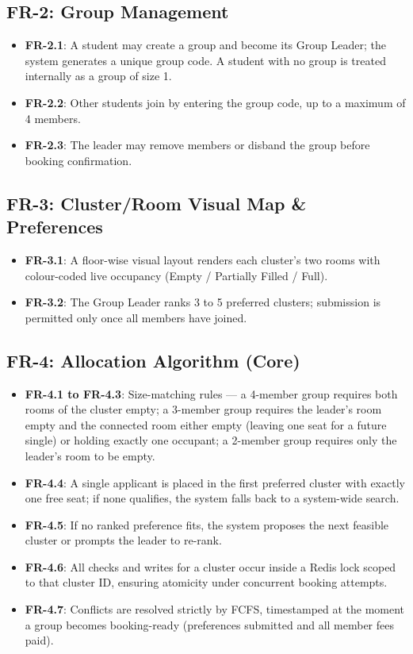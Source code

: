 \documentclass[11pt]{report}
\begin{document}
\subsection*{FR-2: Group Management}
\begin{itemize}[leftmargin=1.2cm]
    \item \textbf{FR-2.1}: A student may create a group and become its Group Leader; the system generates a unique group code. A student with no group is treated internally as a group of size 1.
    \item \textbf{FR-2.2}: Other students join by entering the group code, up to a maximum of 4 members.
    \item \textbf{FR-2.3}: The leader may remove members or disband the group before booking confirmation.
\end{itemize}

\subsection*{FR-3: Cluster/Room Visual Map \& Preferences}
\begin{itemize}[leftmargin=1.2cm]
    \item \textbf{FR-3.1}: A floor-wise visual layout renders each cluster's two rooms with colour-coded live occupancy (Empty / Partially Filled / Full).
    \item \textbf{FR-3.2}: The Group Leader ranks 3 to 5 preferred clusters; submission is permitted only once all members have joined.
\end{itemize}

\subsection*{FR-4: Allocation Algorithm (Core)}
\begin{itemize}[leftmargin=1.2cm]
    \item \textbf{FR-4.1 to FR-4.3}: Size-matching rules --- a 4-member group requires both rooms of the cluster empty; a 3-member group requires the leader's room empty and the connected room either empty (leaving one seat for a future single) or holding exactly one occupant; a 2-member group requires only the leader's room to be empty.
    \item \textbf{FR-4.4}: A single applicant is placed in the first preferred cluster with exactly one free seat; if none qualifies, the system falls back to a system-wide search.
    \item \textbf{FR-4.5}: If no ranked preference fits, the system proposes the next feasible cluster or prompts the leader to re-rank.
    \item \textbf{FR-4.6}: All checks and writes for a cluster occur inside a Redis lock scoped to that cluster ID, ensuring atomicity under concurrent booking attempts.
    \item \textbf{FR-4.7}: Conflicts are resolved strictly by FCFS, timestamped at the moment a group becomes booking-ready (preferences submitted and all member fees paid).
\end{itemize}
\end{document}
